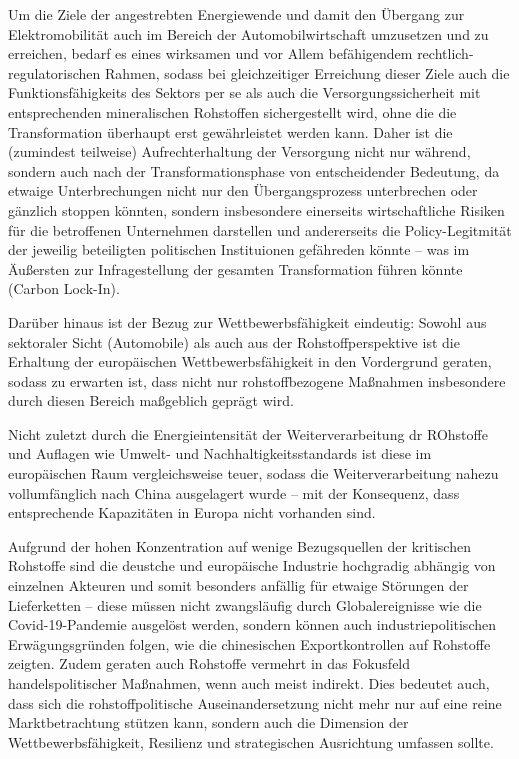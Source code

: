 \documentclass[12pt,a4paper,oneside]{book} %
\begin{document}
	Um die Ziele der angestrebten Energiewende und damit den Übergang zur Elektromobilität auch im Bereich der Automobilwirtschaft umzusetzen und zu erreichen, bedarf es eines wirksamen und vor Allem befähigendem rechtlich-regulatorischen Rahmen, sodass bei gleichzeitiger Erreichung dieser Ziele auch die Funktionsfähigkeits des Sektors per se als auch die Versorgungssicherheit mit entsprechenden mineralischen Rohstoffen sichergestellt wird, ohne die die Transformation überhaupt erst gewährleistet werden kann. Daher ist die (zumindest teilweise) Aufrechterhaltung der Versorgung nicht nur während, sondern auch nach der Transformationsphase von entscheidender Bedeutung, da etwaige Unterbrechungen nicht nur den Übergangsprozess unterbrechen oder gänzlich stoppen könnten, sondern insbesondere einerseits wirtschaftliche Risiken für die betroffenen Unternehmen darstellen und andererseits die Policy-Legitmität der jeweilig beteiligten politischen Instituionen gefähreden könnte -- was im Äußersten zur Infragestellung der gesamten Transformation führen könnte (\glqq Carbon Lock-In\grqq).
	
	Darüber hinaus ist der Bezug zur Wettbewerbsfähigkeit eindeutig: Sowohl aus sektoraler Sicht (Automobile) als auch aus der Rohstoffperspektive ist die Erhaltung der europäischen Wettbewerbsfähigkeit in den Vordergrund geraten, sodass zu erwarten ist, dass nicht nur rohstoffbezogene Maßnahmen insbesondere durch diesen Bereich maßgeblich geprägt wird.
	
	Nicht zuletzt durch die Energieintensität der Weiterverarbeitung dr ROhstoffe und Auflagen wie Umwelt- und Nachhaltigkeitsstandards ist diese im europäischen Raum vergleichsweise teuer, sodass die Weiterverarbeitung nahezu vollumfänglich nach China ausgelagert wurde -- mit der Konsequenz, dass entsprechende Kapazitäten in Europa nicht vorhanden sind.
	
	Aufgrund der hohen Konzentration auf wenige Bezugsquellen der kritischen Rohstoffe sind die deustche und europäische Industrie hochgradig abhängig von einzelnen Akteuren und somit besonders anfällig für etwaige Störungen der Lieferketten -- diese müssen nicht zwangsläufig durch Globalereignisse wie die Covid-19-Pandemie ausgelöst werden, sondern können auch industriepolitischen Erwägungsgründen folgen, wie die chinesischen Exportkontrollen auf Rohstoffe zeigten. Zudem geraten auch Rohstoffe vermehrt in das Fokusfeld handelspolitischer Maßnahmen, wenn auch meist indirekt. Dies bedeutet auch, dass sich die rohstoffpolitische Auseinandersetzung nicht mehr nur auf eine reine Marktbetrachtung stützen kann, sondern auch die Dimension der Wettbewerbsfähigkeit, Resilienz und strategischen Ausrichtung umfassen sollte.
	
\end{document}
